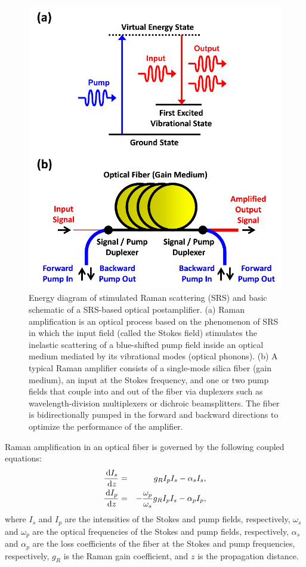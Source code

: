\begin{figure}[htb!]
\centering
\includegraphics[scale=1]{JOSAA2013/Figure2.png}
\caption{Energy diagram of stimulated Raman scattering (SRS) and basic schematic of a SRS-based optical postamplifier. (a) Raman amplification is an optical process based on the phenomenon of SRS in which the input field (called the Stokes field) stimulates the inelastic scattering of a blue-shifted pump field inside an optical medium mediated by its vibrational modes (optical phonons). (b) A typical Raman amplifier consists of a single-mode silica fiber (gain medium), an input at the Stokes frequency, and one or two pump fields that couple into and out of the fiber via duplexers such as wavelength-division multiplexers or dichroic beamsplitters. The fiber is bidirectionally pumped in the forward and backward directions to optimize the performance of the amplifier.}
\label{fig:JOSAA2013_Figure2}
\end{figure}

Raman amplification in an optical fiber is governed by the following coupled equations:
\begin{eqnarray}
\frac{\,\mathrm{d} I_s}{\,\mathrm{d} z} &=& g_R I_p I_s - \alpha_s I_s,\label{eqn:JOSAA_Equation_1}\\
\frac{\,\mathrm{d} I_p}{\,\mathrm{d} z} &=& -\frac{\omega_p}{\omega_s} g_R I_p I_s- \alpha_p I_p,\label{eqn:JOSAA_Equation_2}
\end{eqnarray}
where $I_s$ and $I_p$ are the intensities of the Stokes and pump fields, respectively, $\omega_s$ and $\omega_p$ are the optical frequencies of the Stokes and pump fields, respectively, $\alpha_s$ and $\alpha_p$ are the loss coefficients of the fiber at the Stokes and pump frequencies, respectively, $g_R$ is the Raman gain coefficient, and $z$ is the propagation distance.

